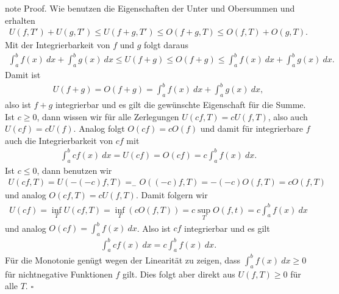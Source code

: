 \documentclass[letterpaper,10pt,english]{jupyterBook}
\begin{document}
\begin{sphinxadmonition}{note}
Proof. Wie benutzen die Eigenschaften der Unter\sphinxhyphen{} und Obersummen und erhalten
\begin{equation*}
\begin{split} U(f,T') + U(g,T') \leq U(f+g,T') \leq O(f+g,T) \leq O(f,T) + O(g,T) .\end{split}
\end{equation*}
Mit der Integrierbarkeit von \(f\) und \(g\) folgt daraus
\begin{equation*}
\begin{split} \int_a^b f(x)~dx + \int_a^b g(x)~dx \leq U(f+g) \leq O(f+g) \leq \int_a^b f(x)~dx + \int_a^b g(x)~dx.\end{split}
\end{equation*}
Damit ist
\begin{equation*}
\begin{split} U(f+g) = O(f+g) = \int_a^b f(x)~dx + \int_a^b g(x)~dx,\end{split}
\end{equation*}
also ist \(f+g\) integrierbar und es gilt die gewünschte Eigenschaft für die Summe.
Ist \(c \geq 0\), dann wissen wir für alle Zerlegungen
\( U(cf,T) = c U(f,T)\), also auch \(U(cf) = c U(f)\). Analog folgt \(O(cf) = c O(f)\) und damit für integrierbare \(f\) auch die
Integrierbarkeit von \(c f\) mit
\begin{equation*}
\begin{split}  \int_a^b c f(x)~dx = U(cf) = O(cf) = c  \int_a^b f(x)~dx.\end{split}
\end{equation*}
Ist \(c \leq 0\), dann benutzen wir
\begin{equation*}
\begin{split} U(cf,T) = U(-(-c)f,T) = _- O((-c)f,T) = - (-c) O(f,T) = c O(f,T)\end{split}
\end{equation*}
und analog \(O(cf,T) = c U(f,T)\). Damit folgern wir
\begin{equation*}
\begin{split} U(cf) = \inf_T U(cf,T) = \inf_T (c O(f,T)) = c \sup_T O(f,t) = c \int_a^b f(x)~dx\end{split}
\end{equation*}
und analog \(O(cf) = \int_a^b f(x)~dx \). Also ist \(cf\) integrierbar und es gilt
\begin{equation*}
\begin{split}  \int_a^b c f(x)~dx = c \int_a^b f(x)~dx.\end{split}
\end{equation*}
Für die Monotonie genügt wegen der Linearität zu zeigen, dass \(\int_a^b f(x)~dx \geq 0\) für nichtnegative Funktionen \(f\) gilt. Dies folgt aber direkt aus \(U(f,T) \geq 0\) für alle \(T\). \(\square\)
\end{sphinxadmonition}
\end{document}
